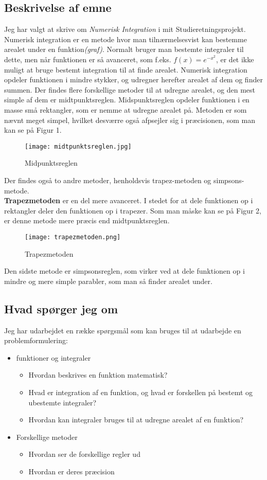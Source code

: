 \documentclass[12pt]{article}
\numberwithin{equation}{section}
\begin{document}
\subsection{Beskrivelse af emne}
Jeg har valgt at skrive om \emph{Numerisk Integration} i mit Studieretningsprojekt. Numerisk integration er en metode hvor man tilnærmelsesvist kan bestemme arealet under en funktion\emph{(graf)}. Normalt bruger man bestemte integraler til dette, men når funktionen er så avanceret, som f.eks. $f(x)=e^{-x^2}$, er det ikke muligt at bruge bestemt integration til at finde arealet.
Numerisk integration opdeler funktionen i mindre stykker, og udregner herefter arealet af dem og finder summen. Der findes flere forskellige metoder til at udregne arealet, og den mest simple af dem er midtpunktsreglen. Midspunktsreglen opdeler funktionen i en masse små rektangler, som er nemme at udregne arealet på. Metoden er som nævnt meget simpel, hvilket desværre også afpsejler sig i præcisionen, som man kan se på Figur 1.
\begin{figure}[hbtp]
\caption{Midpunktsreglen}
\centering
\texttt{[image: midtpunktsreglen.jpg]}
\end{figure}

Der findes også to andre metoder, henholdsvis trapez-metoden og simpsons-metode.\\
\textbf{Trapezmetoden} er en del mere avanceret. I stedet for at dele funktionen op i rektangler deler den funktionen op i trapezer. Som man måske kan se på Figur 2, er denne metode mere præcis end midtpunktsreglen.
\begin{figure}[hbtp]
\caption{Trapezmetoden}
\centering
\texttt{[image: trapezmetoden.png]}
\end{figure}

Den sidste metode er simpsonsreglen, som virker ved at dele funktionen op i mindre og mere simple parabler, som man så finder arealet under.

\subsection{Hvad spørger jeg om}
\label{sec:hvad}
Jeg har udarbejdet en række spørgsmål som kan bruges til at udarbejde en problemformulering:
\begin{itemize}
\item funktioner og integraler
\begin{itemize}
\item Hvordan beskrives en funktion matematisk?
\item Hvad er integration af en funktion, og hvad er forskellen på bestemt og ubestemte integraler?
\item Hvordan kan integraler bruges til at udregne arealet af en funktion?
\end{itemize}

\item Forskellige metoder
\begin{itemize}
\item Hvordan ser de forskellige regler ud
\item Hvordan er deres præcision
\end{itemize}

\end{itemize}
\end{document}
